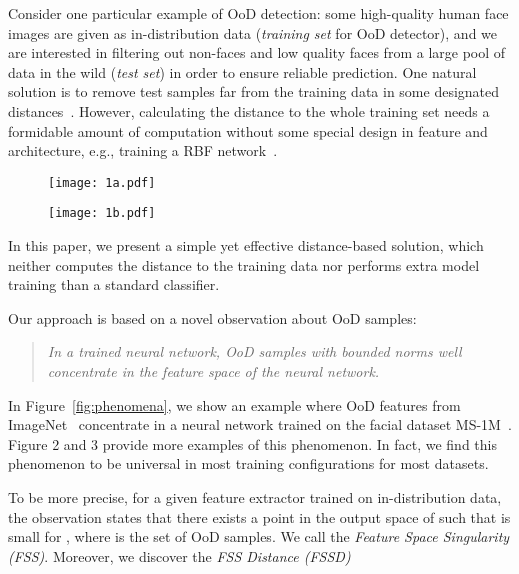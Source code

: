 \documentclass[letterpaper]{article}
\begin{document}
Consider one particular example of OoD detection: some high-quality human face images are given as in-distribution data (\emph{training set} for OoD detector), and we are interested in filtering out non-faces and low quality faces from a large pool of data in the wild (\emph{test set}) in order to ensure reliable prediction.
One natural solution is to remove test samples far from the training data in some designated distances~\cite{mahalanobis, duq}.
However, calculating the distance to the whole training set needs a formidable amount of computation without some special design in feature and architecture, e.g., training a RBF network~\cite{duq}.
\begin{figure*}[t]
\begin{subfigure}{0.65\textwidth}
  \centering
\texttt{[image: 1a.pdf]}  
\end{subfigure}
\begin{subfigure}{.32\textwidth}
  \centering
\texttt{[image: 1b.pdf]}

\end{subfigure}
\caption{Left: Histogram of FSS Distance (FSSD) of MS1M (in-distribution) and ImageNet (OoD). Exemplar images are shown at different FSSDs. We can see that FSSD reflects the OoD degree: as the FSSD increases, images change from non-faces and  pseudo-faces, to low-quality faces and high-quality faces. Right: Principle components of features from the penultimate layer. The spatial relationship among FSS, OoD data, and in-distribution data is shown.}
\label{fig:phenomena}
\end{figure*}
In this paper, we present a simple yet effective distance-based solution, which neither computes the distance to the training data nor performs extra model training than a standard classifier.

Our approach is based on a novel observation about OoD samples:
\begin{quote}
\emph{In a trained neural network, OoD samples with bounded norms well concentrate in the feature space of the neural network.}
\end{quote}
In Figure~\ref{fig:phenomena}, we show an example where OoD features from ImageNet~\cite{imagenet} concentrate in a neural network trained on the facial dataset MS-1M~\cite{ms1m}. Figure 2 and 3 provide more examples of this phenomenon. In fact, we find this phenomenon to be universal in most training configurations for most datasets.

To be more precise, for a given  feature extractor  trained on in-distribution data, the observation states that there exists a point  in the output space
of  such that  is small for , where  is the set of OoD samples.
We call  the \emph{Feature Space Singularity (FSS)}.
Moreover, we discover  the \emph{FSS Distance (FSSD)} 
\end{document}
